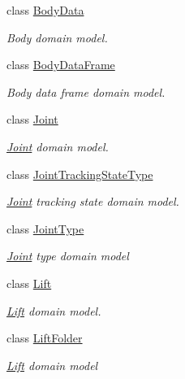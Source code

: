 \begin{DoxyCompactItemize}
\item 
class \mbox{\hyperlink{class_bar_none_1_1_shared_1_1_domain_model_1_1_body_data}{Body\+Data}}
\begin{DoxyCompactList}\small\item\em Body domain model. \end{DoxyCompactList}\item 
class \mbox{\hyperlink{class_bar_none_1_1_shared_1_1_domain_model_1_1_body_data_frame}{Body\+Data\+Frame}}
\begin{DoxyCompactList}\small\item\em Body data frame domain model. \end{DoxyCompactList}\item 
class \mbox{\hyperlink{class_bar_none_1_1_shared_1_1_domain_model_1_1_joint}{Joint}}
\begin{DoxyCompactList}\small\item\em \mbox{\hyperlink{class_bar_none_1_1_shared_1_1_domain_model_1_1_joint}{Joint}} domain model. \end{DoxyCompactList}\item 
class \mbox{\hyperlink{class_bar_none_1_1_shared_1_1_domain_model_1_1_joint_tracking_state_type}{Joint\+Tracking\+State\+Type}}
\begin{DoxyCompactList}\small\item\em \mbox{\hyperlink{class_bar_none_1_1_shared_1_1_domain_model_1_1_joint}{Joint}} tracking state domain model. \end{DoxyCompactList}\item 
class \mbox{\hyperlink{class_bar_none_1_1_shared_1_1_domain_model_1_1_joint_type}{Joint\+Type}}
\begin{DoxyCompactList}\small\item\em \mbox{\hyperlink{class_bar_none_1_1_shared_1_1_domain_model_1_1_joint}{Joint}} type domain model \end{DoxyCompactList}\item 
class \mbox{\hyperlink{class_bar_none_1_1_shared_1_1_domain_model_1_1_lift}{Lift}}
\begin{DoxyCompactList}\small\item\em \mbox{\hyperlink{class_bar_none_1_1_shared_1_1_domain_model_1_1_lift}{Lift}} domain model. \end{DoxyCompactList}\item 
class \mbox{\hyperlink{class_bar_none_1_1_shared_1_1_domain_model_1_1_lift_folder}{Lift\+Folder}}
\begin{DoxyCompactList}\small\item\em \mbox{\hyperlink{class_bar_none_1_1_shared_1_1_domain_model_1_1_lift}{Lift}} domain model \end{DoxyCompactList}\item 

\end{DoxyCompactItemize}
